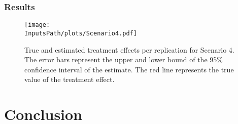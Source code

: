 \documentclass[10pt]{article}
\newcommand*{\InputsFolderPath}{C:/DEV/DML/src/data/}
\newcommand*{\InputsPath}{\InputsFolderPath/20221103}
\begin{document}
\subsubsection{Results}
\begin{figure}[H]
	\begin{center}
		\texttt{[image: \\InputsPath/plots/Scenario4.pdf]}
		\caption{True and estimated treatment effects per replication for Scenario 4. The error bars represent the upper and lower bound of the 95\% confidence interval of the estimate. The red line represents the true value of the treatment effect.}
		\label{Scenario 4}
	\end{center}
\end{figure}


\section{Conclusion}


	
\end{document}
